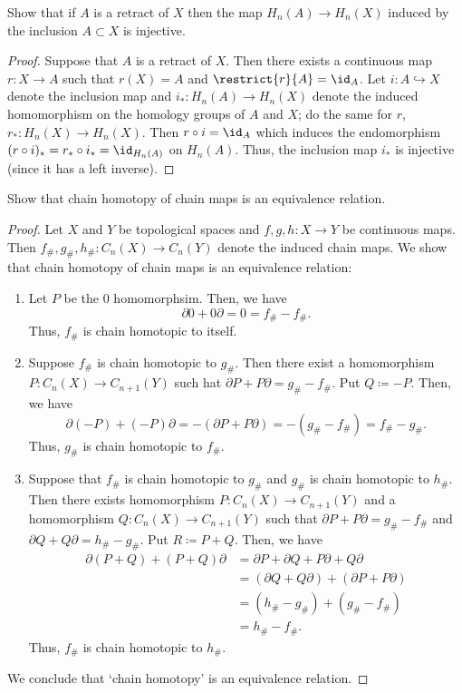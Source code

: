 \begin{problem}[Hatcher {\S}2.1, Ex.\,11]
Show that if $A$ is a retract of $X$ then the map $H_n(A)\to H_n(X)$
induced by the inclusion $A\subset X$ is injective.
\end{problem}
\begin{proof}
Suppose that $A$ is a retract of $X$. Then there exists a continuous map
$r\colon X\to A$ such that $r(X)=A$ and $\restrict{r}{A}=\id_A$. Let
$i\colon A\hookrightarrow X$ denote the inclusion map and
$i_*\colon H_n(A)\to H_n(X)$ denote the induced homomorphism on the
homology groups of $A$ and $X$; do the same for $r$, $r_*\colon H_n(X)\to
H_n(X)$. Then $r\circ i=\id_A$ which induces the endomorphism $(r\circ
i)_*=r_*\circ i_*=\id_{H_n(A)}$ on $H_n(A)$. Thus, the inclusion map
$i_*$ is injective (since it has a left inverse).
\end{proof}
\newpage

\begin{problem}[Hatcher \S2.1, Ex.\,12]
Show that chain homotopy of chain maps is an equivalence relation.
\end{problem}
\begin{proof}
Let $X$ and $Y$ be topological spaces and $f,g,h\colon X\to Y$ be
continuous maps. Then $f_\#,g_\#,h_\#\colon C_n(X)\to C_n(Y)$ denote the
induced chain maps. We show that chain homotopy of chain maps is an
equivalence relation:
\begin{enumerate}[label=(\roman*)]
\item Let $P$ be the $0$ homomorphsim. Then, we have
  \[
    \partial0+0\partial=0=f_\#-f_\#.
  \]
  Thus, $f_\#$ is chain homotopic to itself.
\item Suppose $f_\#$ is chain homotopic to $g_\#$. Then there exist a
  homomorphism $P\colon C_n(X)\to C_{n+1}(Y)$ such hat $\partial
  P+P\partial=g_\#-f_\#$. Put $Q\coloneqq -P$. Then, we have
  \[
    \partial(-P)+(-P)\partial=-(\partial P+P\partial)=-(g_\#-f_\#)=f_\#-g_\#.
  \]
  Thus, $g_\#$ is chain homotopic to $f_\#$.
\item Suppose that $f_\#$ is chain homotopic to $g_\#$ and $g_\#$ is chain
  homotopic to $h_\#$. Then there exists homomorphism $P\colon C_n(X)\to
  C_{n+1}(Y)$ and a homomorphism $Q\colon C_n(X)\to C_{n+1}(Y)$ such that
  $\partial P+P\partial=g_\#-f_\#$ and $\partial
  Q+Q\partial=h_\#-g_\#$. Put $R\coloneqq P+Q$. Then, we have
  \begin{align*}
    \partial (P+Q)+(P+Q)\partial
    &=\partial P+\partial Q+P\partial+Q\partial\\
    &=(\partial Q+Q\partial)+(\partial P+P\partial)\\
    &=(h_\#-g_\#)+(g_\#-f_\#)\\
    &=h_\#-f_\#.
  \end{align*}
  Thus, $f_\#$ is chain homotopic to $h_\#$.
\end{enumerate}
We conclude that `chain homotopy' is an equivalence relation.
\end{proof}
\newpage


